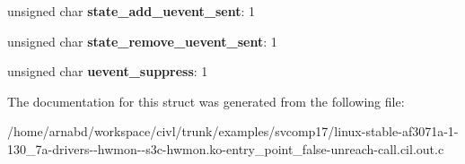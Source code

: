 \begin{DoxyCompactItemize}
\item 
\hypertarget{structkobject_a16ac041609fb9ab8ec2d5185db3ef4ef}{}unsigned char {\bfseries state\+\_\+add\+\_\+uevent\+\_\+sent}\+: 1\label{structkobject_a16ac041609fb9ab8ec2d5185db3ef4ef}

\item 
\hypertarget{structkobject_aedd25ecd8705305adf85d10263ad37a7}{}unsigned char {\bfseries state\+\_\+remove\+\_\+uevent\+\_\+sent}\+: 1\label{structkobject_aedd25ecd8705305adf85d10263ad37a7}

\item 
\hypertarget{structkobject_a6fe03d06ec4af02ff11f392f5b34f880}{}unsigned char {\bfseries uevent\+\_\+suppress}\+: 1\label{structkobject_a6fe03d06ec4af02ff11f392f5b34f880}

\end{DoxyCompactItemize}


The documentation for this struct was generated from the following file\+:\begin{DoxyCompactItemize}
\item 
/home/arnabd/workspace/civl/trunk/examples/svcomp17/linux-\/stable-\/af3071a-\/1-\/130\+\_\+7a-\/drivers-\/-\/hwmon-\/-\/s3c-\/hwmon.\+ko-\/entry\+\_\+point\+\_\+false-\/unreach-\/call.\+cil.\+out.\+c\end{DoxyCompactItemize}
